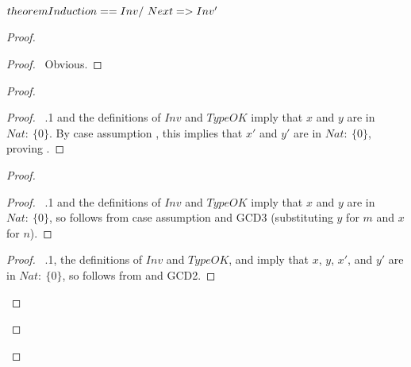\documentclass[fleqn,leqno]{article}
\begin{document}
\noindent
$\THEOREM Induction == Inv /\ Next => Inv'$
\beforePfSpace{0pt}
\afterPfSpace{0pt}
\interStepSpace{0pt}
\vspace{.4em}
\begin{proof}
\begin{proof}
\pf\ Obvious.
\end{proof}
\vspace{.9em}
  \begin{proof}
\vspace{.2em}
\vspace{.1em}
  \begin{proof}
   \pf\ .1 and the definitions of $Inv$ and $TypeOK$ 
   imply that $x$ and $y$ are in $Nat :\: \{0\}$.  By case assumption
    , this implies that $x'$ and $y'$ are in $Nat :\: \{0\}$,
   proving .
   \end{proof}
\vspace{.6em}
\vspace{.3em}
  \begin{proof}
   \vspace{.1em}
     \begin{proof}
     \pf\ .1 and the definitions of $Inv$ and $TypeOK$ 
      imply that $x$ and $y$ are in $Nat :\: \{0\}$, so 
      follows from case assumption  and GCD3 (substituting
      $y$ for $m$ and $x$ for $n$).
     \end{proof}
   \vspace{.4em}
   \vspace{.1em}
      \begin{proof}
     \pf\  .1, the definitions of $Inv$ and $TypeOK$, and
       imply that $x$, $y$, $x'$, and $y'$ are in
       $Nat :\: \{0\}$, so  follows from  and GCD2.
      \end{proof}
   \vspace{.4em}

\end{proof}
\end{proof}
\end{proof}
\end{document}

